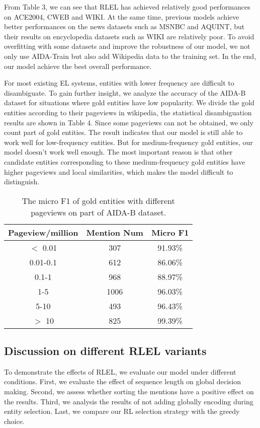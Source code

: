 \documentclass[sigconf]{acmart}
\begin{document}
From Table 3, we can see that RLEL has achieved relatively good performances on ACE2004, CWEB and WIKI. At the same time, previous models \cite{GaneaH17, TitovL18a, ChengR13} achieve better performances on the news datasets such as MSNBC and AQUINT, but their results on encyclopedia datasets such as WIKI are relatively poor. To avoid overfitting with some datasets and improve the robustness of our model, we not only use AIDA-Train but also add Wikipedia data to the training set. In the end, our model achieve the best overall performance.

For most existing EL systems, entities with lower frequency are difficult to disambiguate. To gain further insight, we analyze the accuracy of the AIDA-B dataset for situations where gold entities have low popularity. We divide the gold entities according to their pageviews in wikipedia, the statistical disambiguation results are shown in Table 4. Since some pageviews can not be obtained, we only count part of gold entities. The result indicates that our model is still able to work well for low-frequency entities. But for medium-frequency gold entities, our model doesn't work well enough. The most important reason is that other candidate entities corresponding to these medium-frequency gold entities have higher pageviews and local similarities, which makes the model difficult to distinguish.

\begin{table}
\caption{The micro F1 of gold entities with different pageviews on part of AIDA-B dataset.}
\renewcommand\arraystretch{1}
\newcommand{\tabincell}[2]{\begin{tabular}{@{}#1@{}}#2\end{tabular}}
\centering
\scalebox{1.1} {
\begin{tabular}{|c|c|c|}
\hline  
{Pageview/million} & {Mention Num} & {Micro F1} \\
\hline  
$<$ 0.01 &307 & 91.93\%  \\
\hline  
0.01-0.1  &612 &  86.06\%  \\
\hline 
0.1-1  &968 & 88.97\%  \\
\hline 
1-5 &1006 & 96.03\%  \\
\hline 
5-10  &493 & 96.43\%  \\
\hline 
$>$ 10  &825 & 99.39\%  \\
\hline 
\end{tabular}
}
\setlength{\abovecaptionskip}{8pt}
\end{table}

\subsection{Discussion on different RLEL variants}
To demonstrate the effects of RLEL, we evaluate our model under different conditions. First, we evaluate the effect of sequence length on global decision making. Second, we assess whether sorting the mentions have a positive effect on the results. Third, we analysis the results of not adding globally encoding during entity selection. Last, we compare our RL selection strategy with the greedy choice. 
\end{document}

